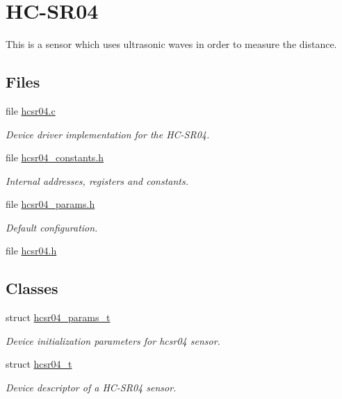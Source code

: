 \hypertarget{group__drivers__hcsr04}{}\section{H\+C-\/\+S\+R04}
\label{group__drivers__hcsr04}


This is a sensor which uses ultrasonic waves in order to measure the distance.  


\subsection*{Files}
\begin{DoxyCompactItemize}
\item 
file \hyperlink{hcsr04_8c}{hcsr04.\+c}
\begin{DoxyCompactList}\small\item\em Device driver implementation for the H\+C-\/\+S\+R04. \end{DoxyCompactList}\item 
file \hyperlink{hcsr04__constants_8h}{hcsr04\+\_\+constants.\+h}
\begin{DoxyCompactList}\small\item\em Internal addresses, registers and constants. \end{DoxyCompactList}\item 
file \hyperlink{hcsr04__params_8h}{hcsr04\+\_\+params.\+h}
\begin{DoxyCompactList}\small\item\em Default configuration. \end{DoxyCompactList}\item 
file \hyperlink{hcsr04_8h}{hcsr04.\+h}
\end{DoxyCompactItemize}
\subsection*{Classes}
\begin{DoxyCompactItemize}
\item 
struct \hyperlink{structhcsr04__params__t}{hcsr04\+\_\+params\+\_\+t}
\begin{DoxyCompactList}\small\item\em Device initialization parameters for hcsr04 sensor. \end{DoxyCompactList}\item 
struct \hyperlink{structhcsr04__t}{hcsr04\+\_\+t}
\begin{DoxyCompactList}\small\item\em Device descriptor of a H\+C-\/\+S\+R04 sensor. \end{DoxyCompactList}\end{DoxyCompactItemize}
